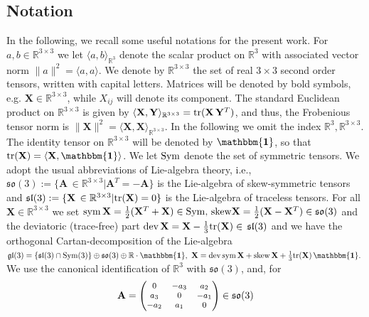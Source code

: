 \documentclass[10pt]{article}
\newcommand{\id}{{\mathbf{\mathbbm{1}}}}
\newcommand{\tr}{{\rm tr}}
\newcommand{\dev}{{\rm dev}}
\newcommand{\Sym}{{\rm Sym}}
\newcommand{\sym}{{\rm sym}}
\newcommand{\skw}{{\rm skew}}
\newcommand{\so}{\mathfrak{so}}
\newcommand{\norm}[1]{\|#1\|}
\begin{document}
\begin{footnotesize}
\section{Notation}\label{NS}
In the following, we recall some useful notations for the present work. For $ a,b\in \mathbb{R}^{3 \times 3} $ we let $\langle{a,b}\rangle_{\mathbb{R}^3}$ denote the scalar product on $ \mathbb{R}^3$ with associated vector norm $\norm{a}^2=\langle {a,a}\rangle$. We denote by $\mathbb{R}^{3\times 3}$   the set of real $3 \times 3$ second order tensors, written with capital letters. Matrices will be denoted by bold symbols, e.g. $\mathbf{X}\in \mathbb{R}^{3\times 3}$, while $X_{ij}$ will denote its component. The standard Euclidean product on $\mathbb{R}^{3 \times 3}$ is given by $\langle{ \mathbf{X},\mathbf{Y}}\rangle_{\mathbb{R}^{3 \times 3}}=\tr( \mathbf{X}\,\mathbf{Y}^T)$, and thus, the Frobenious tensor norm is $\norm{ \mathbf{X}}^2=\langle{ \mathbf{X}, \mathbf{X}}\rangle_{\mathbb{R}^{3 \times 3}}$. In the following we omit the index $\mathbb{R}^3, \mathbb{R}^{3\times 3}$. The identity tensor on $\mathbb{R}^{3\times 3}$ will be denoted by $\id$, so that $\tr( \mathbf{X})=\langle{ \mathbf{X},\id}\rangle$. We let $\Sym$  denote the set of symmetric tensors. We adopt the usual abbreviations of  Lie-algebra theory, i.e., $\mathfrak{so}(3):=\{ \mathbf{A}\,\in \mathbb{R}^{3\times 3}| \mathbf{A}^T=- \mathbf{A}\}$ is the Lie-algebra of skew-symmetric tensors and $\mathfrak{sl}(3):=\{ \mathbf{X}\, \in \mathbb{R}^{3\times 3} |\tr( \mathbf{X})=0 \}$  is the Lie-algebra of traceless tensors. For all $ \mathbf{X} \in\mathbb{R}^{3\times 3}$  we set $\sym\,  \mathbf{X}=\frac{1}{2}( \mathbf{X}^T+ \mathbf{X}) \in\Sym,\,\skw  \mathbf{X}=\frac{1}{2}( \mathbf{X}- \mathbf{X}^T)\in \mathfrak{so}(3)$ and the deviatoric (trace-free) part $\dev\, \mathbf{X}= \mathbf{X}-\frac{1}{3}\tr( \mathbf{X})\in\, \mathfrak{sl}(3)$ and we have the orthogonal Cartan-decomposition of the Lie-algebra $
\mathfrak{gl}(3)=\{\mathfrak{sl}(3)\cap \Sym(3)\}\oplus\mathfrak{so}(3)\oplus\mathbb{R}\cdot\id,\ 
\mathbf{X}= \dev\,\sym\, \mathbf{X}+\skw\, \mathbf{X}+\frac{1}{3}\tr( \mathbf{X})\,\id.\
$
We use the canonical identification of $\mathbb{R}^3$ with $\so(3)$, and, for
\begin{align}
	\mathbf{A}=	\begin{footnotesize}\begin{pmatrix}
			0 &-a_3&a_2\\
			a_3&0& -a_1\\
			-a_2& a_1&0
	\end{pmatrix}\end{footnotesize}\in \so(3)

\end{align}
\end{footnotesize}
\end{document}
